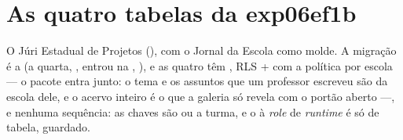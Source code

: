 \section{As quatro tabelas da exp06ef1b}
\label{sec:tabelas-exp06ef1b}

O Júri Estadual de Projetos (), com o Jornal da Escola como
molde. A migração é a
 (a quarta,
, entrou na
, ), e as quatro têm , RLS  +
 com a política por escola --- o pacote entra junto: o tema e os
assuntos que um professor escreveu são da escola dele, e o acervo inteiro é o
que a galeria só revela com o portão aberto ---, e nenhuma sequência: as chaves
são  ou a turma, e o  à \emph{role} de \emph{runtime} é só de
tabela, guardado.


